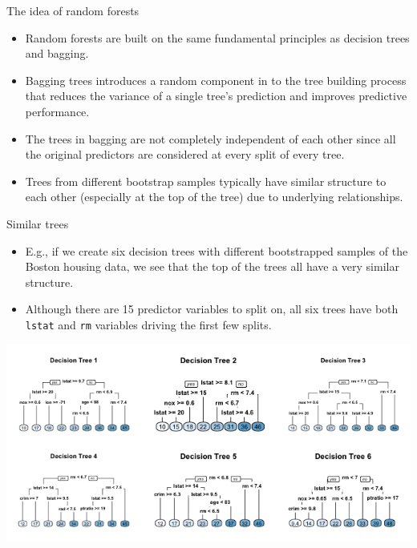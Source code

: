 \documentclass[10pt,ignorenonframetext,]{beamer}
\providecommand{\tightlist}{%
  \setlength{\itemsep}{0pt}\setlength{\parskip}{0pt}}
\begin{document}
\begin{frame}{The idea of random forests}

\begin{itemize}
\tightlist
\item
  Random forests are built on the same fundamental principles as
  decision trees and bagging.
\item
  Bagging trees introduces a random component in to the tree building
  process that reduces the variance of a single tree's prediction and
  improves predictive performance.
\item
  The trees in bagging are not completely independent of each other
  since all the original predictors are considered at every split of
  every tree.
\item
  Trees from different bootstrap samples typically have similar
  structure to each other (especially at the top of the tree) due to
  underlying relationships.
\end{itemize}

\end{frame}

\begin{frame}[fragile]{Similar trees}

\begin{itemize}
\tightlist
\item
  E.g., if we create six decision trees with different bootstrapped
  samples of the Boston housing data, we see that the top of the trees
  all have a very similar structure.
\item
  Although there are 15 predictor variables to split on, all six trees
  have both \texttt{lstat} and \texttt{rm} variables driving the first
  few splits.
\end{itemize}

\includegraphics{figure/tree-correlation-1.png}

\end{frame}
\end{document}
